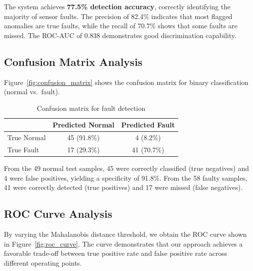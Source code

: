 The system achieves \textbf{77.5\% detection accuracy}, correctly identifying the majority of sensor faults. The precision of 82.4\% indicates that most flagged anomalies are true faults, while the recall of 70.7\% shows that some faults are missed. The ROC-AUC of 0.838 demonstrates good discrimination capability.

\subsection{Confusion Matrix Analysis}

Figure~\ref{fig:confusion_matrix} shows the confusion matrix for binary classification (normal vs.\ fault).


\begin{table}[htbp]
\centering
\caption{Confusion matrix for fault detection}
\label{tab:confusion_matrix}
\begin{tabular}{@{}lcc@{}}
\toprule
 & Predicted Normal & Predicted Fault \\
\midrule
True Normal & 45 (91.8\%) & 4 (8.2\%) \\
True Fault & 17 (29.3\%) & 41 (70.7\%) \\
\bottomrule
\end{tabular}
\end{table}

From the 49 normal test samples, 45 were correctly classified (true negatives) and 4 were false positives, yielding a specificity of 91.8\%. From the 58 faulty samples, 41 were correctly detected (true positives) and 17 were missed (false negatives).

\subsection{ROC Curve Analysis}

By varying the Mahalanobis distance threshold, we obtain the ROC curve shown in Figure~\ref{fig:roc_curve}. The curve demonstrates that our approach achieves a favorable trade-off between true positive rate and false positive rate across different operating points.


